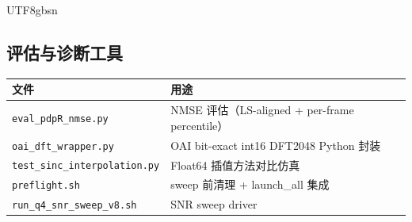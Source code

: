 \documentclass[11pt,a4paper]{article}
\begin{document}
\begin{CJK}{UTF8}{gbsn}
\subsection{评估与诊断工具}

\begin{table}[h]\centering
\begin{tabular}{ll}
\toprule
文件 & 用途 \\
\midrule
\texttt{eval\_pdpR\_nmse.py} & NMSE 评估（LS-aligned + per-frame percentile） \\
\texttt{oai\_dft\_wrapper.py} & OAI bit-exact int16 DFT2048 Python 封装 \\
\texttt{test\_sinc\_interpolation.py} & Float64 插值方法对比仿真 \\
\texttt{preflight.sh} & sweep 前清理 + launch\_all 集成 \\
\texttt{run\_q4\_snr\_sweep\_v8.sh} & SNR sweep driver \\
\bottomrule
\end{tabular}
\end{table}

\end{CJK}
\end{document}
